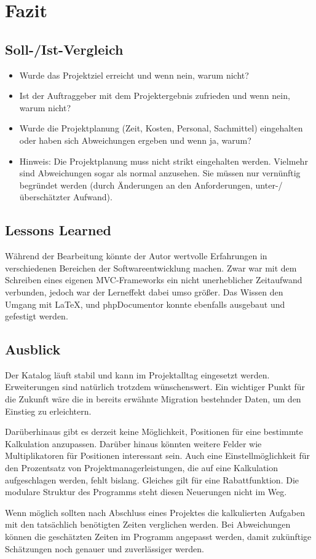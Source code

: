 \section{Fazit} 
\label{sec:Fazit}

\subsection{Soll-/Ist-Vergleich}
\label{sec:SollIstVergleich}

\begin{itemize}
	\item Wurde das Projektziel erreicht und wenn nein, warum nicht?
	\item Ist der Auftraggeber mit dem Projektergebnis zufrieden und wenn nein, warum nicht?
	
	\item Wurde die Projektplanung (Zeit, Kosten, Personal, Sachmittel) eingehalten oder haben sich Abweichungen ergeben und wenn ja, warum?
	\item Hinweis: Die Projektplanung muss nicht strikt eingehalten werden. Vielmehr sind Abweichungen sogar als normal anzusehen. Sie müssen nur vernünftig begründet werden (\zB durch Änderungen an den Anforderungen, unter-/überschätzter Aufwand).
\end{itemize}


\subsection{Lessons Learned}
\label{sec:LessonsLearned}
Während der Bearbeitung könnte der Autor wertvolle Erfahrungen in
verschiedenen Bereichen der Softwareentwicklung machen. Zwar war mit dem
Schreiben eines eigenen \acs{MVC}-Frameworks ein nicht unerheblicher Zeitaufwand
verbunden, jedoch war der Lerneffekt dabei umso größer. Das Wissen \bzgl den
Umgang mit \LaTeX, und phpDocumentor konnte ebenfalls ausgebaut und gefestigt
werden.


\subsection{Ausblick}
\label{sec:Ausblick}
Der Katalog läuft stabil und kann im Projektalltag eingesetzt werden.
Erweiterungen sind natürlich trotzdem wünschenswert. Ein wichtiger Punkt für die
Zukunft wäre die in  bereits erwähnte Migration
bestehnder Daten, um den Einstieg zu erleichtern.

Darüberhinaus gibt es \zB derzeit keine Möglichkeit, Positionen für eine
bestimmte Kalkulation anzupassen. Darüber hinaus könnten weitere Felder wie \bspw
Multiplikatoren für Positionen interessant sein. Auch eine Einstellmöglichkeit
für den Prozentsatz von Projektmanagerleistungen, die auf eine Kalkulation
aufgeschlagen werden, fehlt bislang. Gleiches gilt für eine Rabattfunktion.
Die modulare Struktur des Programms steht diesen Neuerungen nicht im Weg.

Wenn möglich sollten nach Abschluss eines Projektes die kalkulierten Aufgaben
mit den tatsächlich benötigten Zeiten verglichen werden. Bei Abweichungen können
die geschätzten Zeiten im Programm angepasst werden, damit zukünftige
Schätzungen noch genauer und zuverlässiger werden.